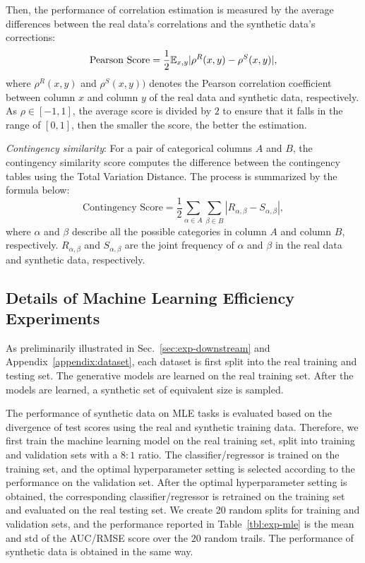 Then, the performance of correlation estimation is measured by the average differences between the real data's correlations and the synthetic data's corrections:
\begin{equation}
    {\text{Pearson Score}} = \frac{1}{2} {\mathbb{E}}_{x,y} | \rho^{R}(x,y) - \rho^{S} (x,y)  |,
\end{equation}
where $\rho^R(x,y)$ and $ \rho^S(x,y))$ denotes the Pearson correlation coefficient between column $x$ and column $y$ of the real data and synthetic data, respectively. As $\rho \in [-1, 1]$, the average score is divided by $2$ to ensure that it falls in the range of $[0,1]$, then the smaller the score, the better the estimation.

\textit{Contingency similarity}: For a pair of categorical columns $A$ and $B$, the contingency similarity score computes the difference between the contingency tables using the Total Variation Distance. The process is summarized by the formula below:
\begin{equation}
    \text{Contingency Score} = \frac{1}{2} \sum\limits_{\alpha \in A} \sum\limits_{\beta \in B} | R_{\alpha, \beta} - S_{\alpha, \beta}|,
\end{equation}
where $\alpha$ and $\beta$ describe all the possible categories in column $A$ and column $B$, respectively. $R_{\alpha, \beta}$ and $S_{\alpha, \beta}$ are the joint frequency of $\alpha$ and $\beta$ in the real data and synthetic data, respectively.

\subsection{Details of Machine Learning Efficiency Experiments}\label{appendix:mle}
As preliminarily illustrated in Sec.~\ref{sec:exp-downstream} and Appendix~\ref{appendix:dataset}, each dataset is first split into the real training and testing set. The generative models are learned on the real training set. After the models are learned, a synthetic set of equivalent size is sampled. 

The performance of synthetic data on MLE tasks is evaluated based on the divergence of test scores using the real and synthetic training data. Therefore, we first train the machine learning model on the real training set, split into training and validation sets with a $8:1$ ratio. The classifier/regressor is trained on the training set, and the optimal hyperparameter setting is selected according to the performance on the validation set. After the optimal hyperparameter setting is obtained, the corresponding classifier/regressor is retrained on the training set and evaluated on the real testing set. We create 20 random splits for training and validation sets, and the performance reported in Table~\ref{tbl:exp-mle} is the mean and std of the AUC/RMSE score over the $20$ random trails. The performance of synthetic data is obtained in the same way.

